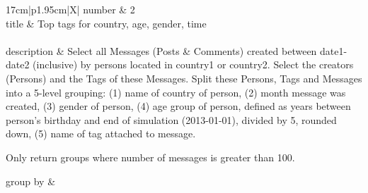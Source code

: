 \renewcommand*{\arraystretch}{1.5}
\noindent\begin{tabularx}{17cm}{|p{1.95cm}|X|}
	\hline
	number      & 2                                                          \\ \hline
	title       & Top tags for country, age, gender, time                                                           \\ \hline
	 \\ \hline
	description & Select all Messages (Posts \& Comments) created between date1-date2
(inclusive) by persons located in country1 or country2. Select the
creators (Persons) and the Tags of these Messages. Split these Persons,
Tags and Messages into a 5-level grouping: (1) name of country of
person, (2) month message was created, (3) gender of person, (4) age
group of person, defined as years between person's birthday and end of
simulation (2013-01-01), divided by 5, rounded down, (5) name of tag
attached to message.

Only return groups where number of messages is greater than 100.
 \\ \hline
	
	group by       &
	\\ \hline
	

\end{tabularx}
